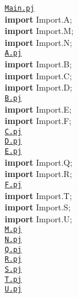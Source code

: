 \documentclass[pdflatex,11pt,letter]{article}
\begin{document}
\noindent
\underline{\tt Main.pj}\\
{\bf import} Import.A;\\
{\bf import} Import.M;\\
{\bf import} Import.N;\\
$ $\\
\underline{\tt A.pj}\\
{\bf import} Import.B;\\
{\bf import} Import.C;\\
{\bf import} Import.D;\\
$ $\\
\underline{\tt B.pj}\\
{\bf import} Import.E;\\
{\bf import} Import.F;\\
$ $\\
\underline{\tt C.pj}\\
$ $\\
\underline{\tt D.pj}\\
$ $\\
\underline{\tt E.pj}\\
{\bf import} Import.Q;\\
{\bf import} Import.R;\\
$ $\\
\underline{\tt F.pj}\\
{\bf import} Import.T;\\
{\bf import} Import.S;\\
{\bf import} Import.U;\\
$ $\\
\underline{\tt M.pj}\\
$ $\\
\underline{\tt N.pj}\\
$ $\\
\underline{\tt Q.pj}\\
$ $\\
\underline{\tt R.pj}\\
$ $\\
\underline{\tt S.pj}\\
$ $\\
\underline{\tt T.pj}\\
$ $\\
\underline{\tt U.pj}\\
\end{document}

